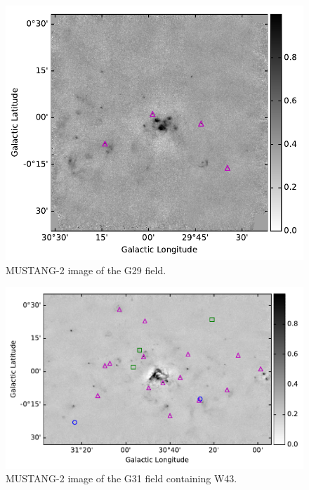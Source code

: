 \documentclass[twocolumn]{aastex62}
\newcommand{\MUSTANG}{MUSTANG-2\xspace}
\begin{document}
\begin{figure}[htp]
\includegraphics[width=17cm]{figures/G29_overview_withcatalog.pdf}
\caption{\MUSTANG image of the G29 field.}
\label{fig:g29overview}
\end{figure}


\begin{figure}[htp]
    \includegraphics[width=17cm]{figures/G31_overview_withcatalog.pdf}
\caption{\MUSTANG image of the G31 field containing W43.
}
\label{fig:w43overview}
\end{figure}
\end{document}
